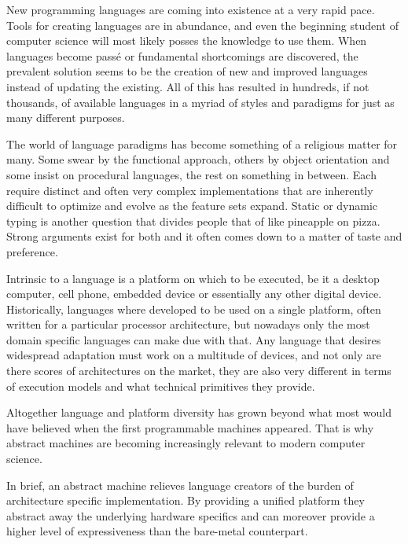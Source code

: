 

New programming languages are coming into existence at a very rapid pace. Tools
for creating languages are in abundance, and even the beginning student of
computer science will most likely posses the knowledge to use them. When
languages become pass\'e or fundamental shortcomings are discovered, the
prevalent solution seems to be the creation of new and improved languages
instead of updating the existing. All of this has resulted in hundreds, if not
thousands, of available languages in a myriad of styles and paradigms for just
as many different purposes.

The world of language paradigms has become something of a religious matter for
many. Some swear by the functional approach, others by object orientation and
some insist on procedural languages, the rest on something in between. Each
require distinct and often very complex implementations that are inherently
difficult to optimize and evolve as the feature sets expand. Static or dynamic
typing is another question that divides people that of like pineapple on
pizza. Strong arguments exist for both and it often comes down to a matter of
taste and preference.

Intrinsic to a language is a platform on which to be executed, be it a desktop
computer, cell phone, embedded device or essentially any other digital
device. Historically, languages where developed to be used on a single platform,
often written for a particular processor architecture, but nowadays only the
most domain specific languages can make due with that. Any language that desires
widespread adaptation must work on a multitude of devices, and not only are
there scores of architectures on the market, they are also very different in
terms of execution models and what technical primitives they provide.

Altogether language and platform diversity has grown beyond what most would have
believed when the first programmable machines appeared. That is why abstract
machines are becoming increasingly relevant to modern computer science.

In brief, an abstract machine relieves language creators of the burden of
architecture specific implementation. By providing a unified platform they
abstract away the underlying hardware specifics and can moreover provide a
higher level of expressiveness than the bare-metal counterpart.


